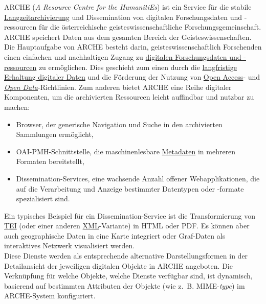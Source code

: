 \documentclass{article}
\begin{document}
    ARCHE (\emph{A Resource Centre for the HumanitiEs}) ist ein Service für die stabile \href{http://gams.uni-graz.at/o:konde.6}{Langzeitarchivierung} und Dissemination von digitalen Forschungsdaten und -ressourcen für die österreichische geisteswissenschaftliche Forschungsgemeinschaft. ARCHE speichert Daten aus dem gesamten Bereich der Geisteswissenschaften.\\
            
        Die Hauptaufgabe von ARCHE besteht darin, geisteswissenschaftlich Forschenden einen einfachen und nachhaltigen Zugang zu \href{http://gams.uni-graz.at/o:konde.87}{digitalen Forschungsdaten und -ressourcen} zu ermöglichen. Dies geschieht zum einen durch die \href{http://gams.uni-graz.at/o:konde.6}{langfristige Erhaltung digitaler Daten} und die Förderung der Nutzung von \href{http://gams.uni-graz.at/o:konde.152}{Open Access}- und \emph{\href{http://gams.uni-graz.at/o:konde.8}{Open Data}}-Richtlinien. Zum anderen bietet ARCHE eine Reihe digitaler Komponenten, um die archivierten Ressourcen leicht auffindbar und nutzbar zu machen:\\
            
        \begin{itemize}\item {Browser, der generische Navigation und Suche in den archivierten Sammlungen ermöglicht, }\item {OAI-PMH-Schnittstelle, die maschinenlesbare \href{http://gams.uni-graz.at/o:konde.25}{Metadaten} in mehreren Formaten bereitstellt, }\item {Dissemination-Services, eine wachsende Anzahl offener Webapplikationen, die auf die Verarbeitung und Anzeige bestimmter Datentypen oder -formate spezialisiert sind. }\end{itemize}Ein typisches Beispiel für ein Dissemination-Service ist die Transformierung von \href{http://gams.uni-graz.at/o:konde.178}{TEI} (oder einer anderen \href{http://gams.uni-graz.at/o:konde.215}{XML}-Variante) in HTML oder PDF. Es können aber auch geographische Daten in eine Karte integriert oder Graf-Daten als interaktives Netzwerk visualisiert werden. \\
            
        Diese Dienste werden als entsprechende alternative Darstellungsformen in der Detailansicht der jeweiligen digitalen Objekte in ARCHE angeboten. Die Verknüpfung für welche Objekte, welche Dienste verfügbar sind, ist dynamisch, basierend auf bestimmten Attributen der Objekte (wie z. B. MIME-\emph{type}) im ARCHE-System konfiguriert.\\
            
\end{document}
